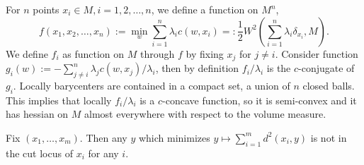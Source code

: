 For $n$ points $x_i \in M, i=1,2,\ldots,n$, we define a function on $M^n$,
\[
	f(x_1, x_2, \ldots, x_n) := \min_{w} \sum_{i=1}^n \lambda_i c(w, x_i) =: \frac{1}{2}W^2(\sum_{i=1}^n \lambda_i \delta_{x_i}, M).
\]
We define $f_i$ as function on $M$ through $f$ by fixing $x_j$ for $j \neq i$.
Consider function $g_i(w) := -\sum_{j\neq i}^n \lambda_j c(w, x_j) / \lambda_i$,
then by definition $f_i /\lambda_i$ is the $c$-conjugate of $g_i$.
Locally barycenters are contained in a compact set, a union of $n$ closed balls.
This implies that locally $f_i / \lambda_i $ is a $c$-concave function,
so it is semi-convex and it has hessian on $M$ almost everywhere with respect to the volume measure.

\begin{lem}
	Fix \( \left( x _ { 1 } , \ldots , x _ { m } \right)\).
	Then any \( y \) which minimizes \( y \mapsto \sum _ { i = 1 } ^ { m } d ^ { 2 } \left( x _ { i } , y \right) \) is not in the cut locus of \( x _ { i } \) for any \( i . \)
\end{lem}


